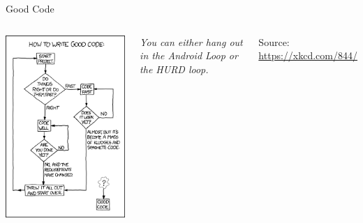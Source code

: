 
\begin{frame}[t,plain]
\titlepage
\end{frame}


\begin{frame}{Good Code}
%
\begin{columns}
\includegraphics[width=\linewidth]{./gfx/16-xkcd-good_code}

\emph{You can either hang out in the Android Loop or the HURD loop.}

\vspace{12pt}
Source: \url{https://xkcd.com/844/}
\end{columns}
%
\end{frame}

